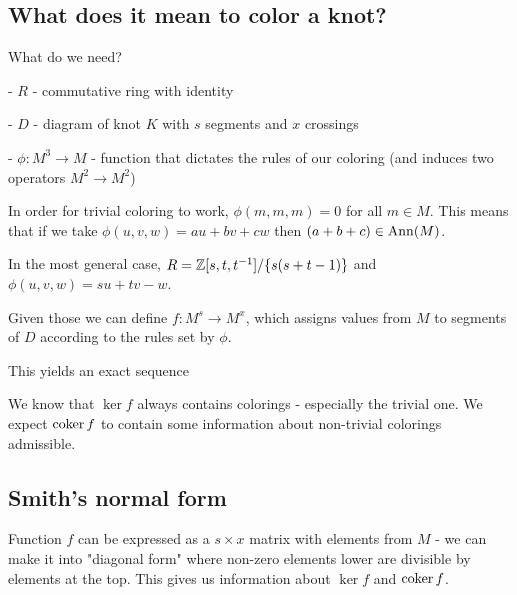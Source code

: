 \subsection{What does it mean to color a knot?}

What do we need?

- $R$ - commutative ring with identity

- $D$ - diagram of knot $K$ with $s$ segments and $x$ crossings

- $\phi:M^3\to M$ - function that dictates the rules of our coloring (and induces two operators $M^2\to M^2$)

In order for trivial coloring to work, $\phi(m,m,m)=0$ for all $m\in M$. This means that if we take $\phi(u, v, w)=au+bv+cw$ then $(a+b+c)\in\operatorname{Ann}(M)$.

In the most general case, $R=\operatorname{\mathbb{Z}}[s, t, t^{-1}]/\{s(s+t-1)\}$ and $\phi(u,v,w)=su+tv-w$.

Given those we can define $f:M^s\to M^x$, which assigns values from $M$ to segments of $D$ according to the rules set by $\phi$.

This yields an exact sequence
\begin{center}\end{center}

We know that $\ker f$ always contains colorings - especially the trivial one. We expect $\operatorname{coker} f$ to contain some information about non-trivial colorings admissible.

\subsection{Smith's normal form}

Function $f$ can be expressed as a $s\times x$ matrix with elements from $M$ - we can make it into "diagonal form" where non-zero elements lower are divisible by elements at the top. This gives us information about $\ker f$ and $\operatorname{coker} f$.

